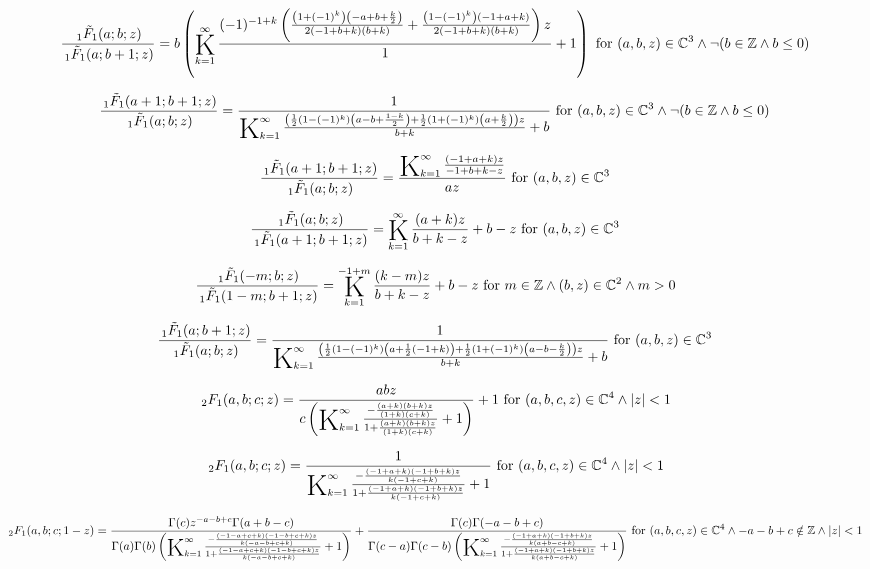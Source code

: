 \documentclass{article}
\newcommand{\bigK}{\mathop{\raisebox{-5pt}{\huge K}}}
\begin{document}
\[\frac{\, _1\tilde{F}_1(a;b;z)}{\, _1\tilde{F}_1(a;b+1;z)}=b \left(\bigK_{k=1}^{\infty}\frac{(-1)^{-1+k} \left(\frac{\left(1+(-1)^k\right) \left(-a+b+\frac{k}{2}\right)}{2 (-1+b+k) (b+k)}+\frac{\left(1-(-1)^k\right) (-1+a+k)}{2 (-1+b+k) (b+k)}\right) z}{1}+1\right)\text{ for }(a,b,z)\in \mathbb{C}^3\land \neg (b\in \mathbb{Z}\land b\leq 0)\] 

\[\frac{\, _1\tilde{F}_1(a+1;b+1;z)}{\, _1\tilde{F}_1(a;b;z)}=\frac{1}{\bigK_{k=1}^{\infty}\frac{\left(\frac{1}{2} \left(1-(-1)^k\right) \left(a-b+\frac{1-k}{2}\right)+\frac{1}{2} \left(1+(-1)^k\right) \left(a+\frac{k}{2}\right)\right) z}{b+k}+b}\text{ for }(a,b,z)\in \mathbb{C}^3\land \neg (b\in \mathbb{Z}\land b\leq 0)\] 

\[\frac{\, _1\tilde{F}_1(a+1;b+1;z)}{\, _1\tilde{F}_1(a;b;z)}=\frac{\bigK_{k=1}^{\infty}\frac{(-1+a+k) z}{-1+b+k-z}}{a z}\text{ for }(a,b,z)\in \mathbb{C}^3\] 

\[\frac{\, _1\tilde{F}_1(a;b;z)}{\, _1\tilde{F}_1(a+1;b+1;z)}=\bigK_{k=1}^{\infty}\frac{(a+k) z}{b+k-z}+b-z\text{ for }(a,b,z)\in \mathbb{C}^3\] 

\[\frac{\, _1\tilde{F}_1(-m;b;z)}{\, _1\tilde{F}_1(1-m;b+1;z)}=\bigK_{k=1}^{-1+m}\frac{(k-m) z}{b+k-z}+b-z\text{ for }m\in \mathbb{Z}\land (b,z)\in \mathbb{C}^2\land m>0\] 

\[\frac{\, _1\tilde{F}_1(a;b+1;z)}{\, _1\tilde{F}_1(a;b;z)}=\frac{1}{\bigK_{k=1}^{\infty}\frac{\left(\frac{1}{2} \left(1-(-1)^k\right) \left(a+\frac{1}{2} (-1+k)\right)+\frac{1}{2} \left(1+(-1)^k\right) \left(a-b-\frac{k}{2}\right)\right) z}{b+k}+b}\text{ for }(a,b,z)\in \mathbb{C}^3\] 

\[\, _2F_1(a,b;c;z)=\frac{a b z}{c \left(\bigK_{k=1}^{\infty}\frac{-\frac{(a+k) (b+k) z}{(1+k) (c+k)}}{1+\frac{(a+k) (b+k) z}{(1+k) (c+k)}}+1\right)}+1\text{ for }(a,b,c,z)\in \mathbb{C}^4\land \left| z\right| <1\] 

\[\, _2F_1(a,b;c;z)=\frac{1}{\bigK_{k=1}^{\infty}\frac{-\frac{(-1+a+k) (-1+b+k) z}{k (-1+c+k)}}{1+\frac{(-1+a+k) (-1+b+k) z}{k (-1+c+k)}}+1}\text{ for }(a,b,c,z)\in \mathbb{C}^4\land \left| z\right| <1\] 

\[\, _2F_1(a,b;c;1-z)=\frac{\Gamma (c) z^{-a-b+c} \Gamma (a+b-c)}{\Gamma (a) \Gamma (b) \left(\bigK_{k=1}^{\infty}\frac{-\frac{(-1-a+c+k) (-1-b+c+k) z}{k (-a-b+c+k)}}{1+\frac{(-1-a+c+k) (-1-b+c+k) z}{k (-a-b+c+k)}}+1\right)}+\frac{\Gamma (c) \Gamma (-a-b+c)}{\Gamma (c-a) \Gamma (c-b) \left(\bigK_{k=1}^{\infty}\frac{-\frac{(-1+a+k) (-1+b+k) z}{k (a+b-c+k)}}{1+\frac{(-1+a+k) (-1+b+k) z}{k (a+b-c+k)}}+1\right)}\text{ for }(a,b,c,z)\in \mathbb{C}^4\land -a-b+c\notin \mathbb{Z}\land \left| z\right| <1\] 
\end{document}
